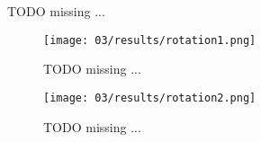   \colorbox{BurntOrange}{TODO missing ...}

  \begin{figure}[H]
    \centering
    \texttt{[image: 03/results/rotation1.png]}
    \caption{
      \colorbox{BurntOrange}{TODO missing ...}
    }
    \label{fig:CP_results_rotation1}
  \end{figure}
  \begin{figure}[H]
    \centering
    \texttt{[image: 03/results/rotation2.png]}
    \caption{
      \colorbox{BurntOrange}{TODO missing ...}
    }
    \label{fig:CP_results_rotation2}
  \end{figure}

